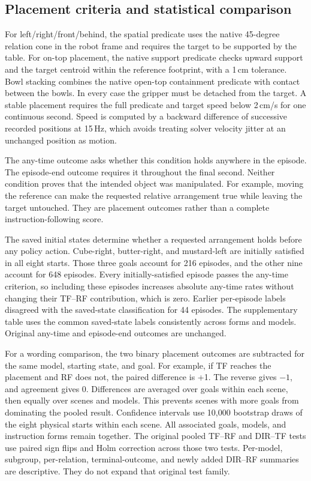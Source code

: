 \documentclass{article}
\begin{document}
\subsection{Placement criteria and statistical comparison}\label{app:statistics}
For left/right/front/behind, the spatial predicate uses the native 45-degree relation cone in the robot frame and requires the target to be supported by the table. For on-top placement, the native support predicate checks upward support and the target centroid within the reference footprint, with a 1\,cm tolerance. Bowl stacking combines the native open-top containment predicate with contact between the bowls. In every case the gripper must be detached from the target. A stable placement requires the full predicate and target speed below 2\,cm/s for one continuous second. Speed is computed by a backward difference of successive recorded positions at 15\,Hz, which avoids treating solver velocity jitter at an unchanged position as motion.

The any-time outcome asks whether this condition holds anywhere in the episode. The episode-end outcome requires it throughout the final second. Neither condition proves that the intended object was manipulated. For example, moving the reference can make the requested relative arrangement true while leaving the target untouched. They are placement outcomes rather than a complete instruction-following score.

The saved initial states determine whether a requested arrangement holds before any policy action. Cube-right, butter-right, and mustard-left are initially satisfied in all eight starts. Those three goals account for 216 episodes, and the other nine account for 648 episodes. Every initially-satisfied episode passes the any-time criterion, so including these episodes increases absolute any-time rates without changing their TF--RF contribution, which is zero. Earlier per-episode labels disagreed with the saved-state classification for 44 episodes. The supplementary table uses the common saved-state labels consistently across forms and models. Original any-time and episode-end outcomes are unchanged.

For a wording comparison, the two binary placement outcomes are subtracted for the same model, starting state, and goal. For example, if TF reaches the placement and RF does not, the paired difference is +1. The reverse gives $-1$, and agreement gives 0. Differences are averaged over goals within each scene, then equally over scenes and models. This prevents scenes with more goals from dominating the pooled result. Confidence intervals use 10,000 bootstrap draws of the eight physical starts within each scene. All associated goals, models, and instruction forms remain together. The original pooled TF--RF and DIR--TF tests use paired sign flips and Holm correction across those two tests. Per-model, subgroup, per-relation, terminal-outcome, and newly added DIR--RF summaries are descriptive. They do not expand that original test family.
\end{document}
